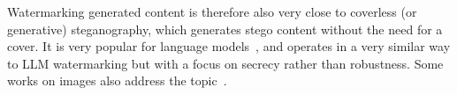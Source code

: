 Watermarking generated content is therefore also very close to coverless (or generative) \gls*{steganography}, which generates stego content without the need for a cover.
It is very popular for language models~\citep{fang2017generating, yang2018rnn, ziegler2019neural, yang2020vae, cao2022generative}, and operates in a very similar way to LLM watermarking but with a focus on secrecy rather than robustness.
Some works on images also address the topic~\citep{hu2018novel, volkhonskiy2020steganographic, liu2022image, zhou2023generative}.









